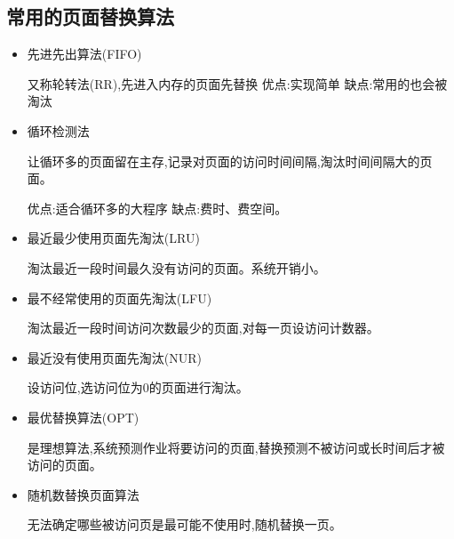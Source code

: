 \documentclass[UTF8,a4paper]{ctexart}%
\begin{document}
          \subsection{常用的页面替换算法}
              \begin{itemize}
                \item 先进先出算法(FIFO)

                    又称轮转法(RR),先进入内存的页面先替换
                    优点:实现简单
                    缺点:常用的也会被淘汰

                \item 循环检测法

                    让循环多的页面留在主存,记录对页面的访问时间间隔,淘汰时间间隔大的页面。

                    优点:适合循环多的大程序
                    缺点:费时、费空间。

                \item 最近最少使用页面先淘汰(LRU)

                    淘汰最近一段时间最久没有访问的页面。系统开销小。

                \item 最不经常使用的页面先淘汰(LFU)

                    淘汰最近一段时间访问次数最少的页面,对每一页设访问计数器。

                \item 最近没有使用页面先淘汰(NUR)

                    设访问位,选访问位为0的页面进行淘汰。

                \item 最优替换算法(OPT)

                    是理想算法,系统预测作业将要访问的页面,替换预测不被访问或长时间后才被访问的页面。

                \item 随机数替换页面算法

                    无法确定哪些被访问页是最可能不使用时,随机替换一页。
              \end{itemize}
\end{document}
